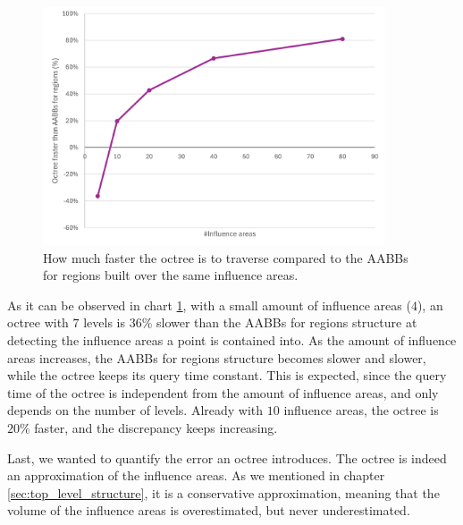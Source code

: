 \documentclass{PoliMi_MasterThesis}
\begin{document}
\begin{figure}[H] 
	\centering
	\includegraphics[width=0.9\textwidth]{Images/octree_scaling_with_influence_areas_chart.png}
	\caption{How much faster the octree is to traverse compared to the AABBs for regions built over the same influence areas.}
	\label{fig:octree_scaling_with_influence_areas_chart}
\end{figure}

As it can be observed in chart \ref{fig:octree_scaling_with_influence_areas_chart}, with a small amount of influence areas ($4$), an octree with $7$ levels is $36\%$ slower than the AABBs for regions structure at detecting the influence areas a point is contained into. As the amount of influence areas increases, the AABBs for regions structure becomes slower and slower, while the octree keeps its query time constant. This is expected, since the query time of the octree is independent from the amount of influence areas, and only depends on the number of levels. Already with $10$ influence areas, the octree is $20\%$ faster, and the discrepancy keeps increasing. 

Last, we wanted to quantify the error an octree introduces. The octree is indeed an approximation of the influence areas. As we mentioned in chapter \ref{sec:top_level_structure}, it is a conservative approximation, meaning that the volume of the influence areas is overestimated, but never underestimated.
\end{document}

